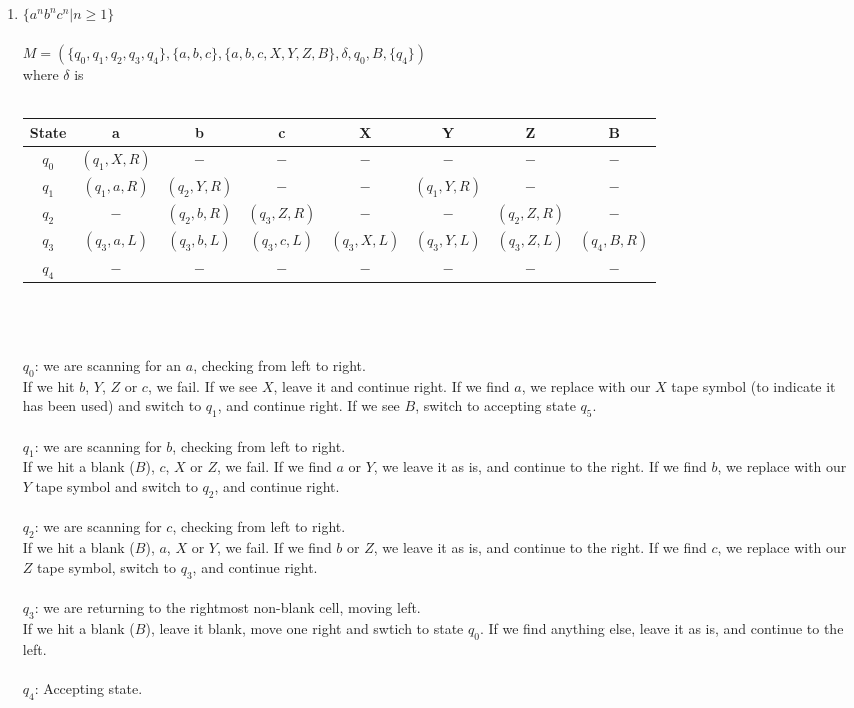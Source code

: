 \documentclass[a4paper]{article}
\begin{document}
\begin{enumerate}
\begin{enumerate}[1.]
\item $\{a^nb^nc^n|n \geq 1\}$
\\ \\
$M = (\{q_0, q_1, q_2, q_3, q_4\}, \{a,b,c\}, \{a,b,c,X, Y, Z, B\}, \delta, q_0, B, \{q_4\})$ \\ 
where $\delta$ is \\
\\
\begin{tabular}{c| c c c c c c c}
State & a & b & c & X & Y & Z & B \\
\hline
$q_0$ & $(q_1, X, R)$ & $-$ & $-$ & $-$ & $-$ & $-$ & $-$ \\
$q_1$ & $(q_1, a, R)$ & $(q_2, Y, R)$ & $-$ & $-$ & $(q_1, Y, R)$ & $-$ & $-$ \\
$q_2$ & $-$ & $(q_2, b, R)$ & $(q_3, Z, R)$ & $-$ & $-$ & $(q_2, Z, R)$ & $-$ \\
$q_3$ & $(q_3,a,L)$ & $(q_3,b,L)$ & $(q_3,c,L)$ & $(q_3,X,L)$ & $(q_3,Y,L)$ & $(q_3,Z,L)$ & $(q_4,B,R)$ \\
$q_4$ & $-$ & $-$ & $-$ & $-$ & $-$ & $-$ & $-$ \\
\end{tabular}
\\ \\ \\
$q_0$: we are scanning for an $a$, checking from left to right. \\
If we hit $b$, $Y$, $Z$ or $c$, we fail. If we see $X$, leave it and continue right. If we find $a$, we replace with our $X$ tape symbol (to indicate it has been used) and switch to $q_1$, and continue right. If we see $B$, switch to accepting state $q_5$. \\
\\
$q_1$: we are scanning for $b$, checking from left to right. \\
If we hit a blank ($B$), $c$, $X$ or $Z$, we fail. If we find $a$ or $Y$, we leave it as is, and continue to the right. If we find $b$, we replace with our $Y$ tape symbol and switch to $q_2$, and continue right. \\
\\
$q_2$: we are scanning for $c$, checking from left to right. \\
If we hit a blank ($B$), $a$, $X$ or $Y$, we fail. If we find $b$ or $Z$, we leave it as is, and continue to the right. If we find $c$, we replace with our $Z$ tape symbol, switch to $q_3$, and continue right. \\
\\
$q_3$: we are returning to the rightmost non-blank cell, moving left. \\
If we hit a blank ($B$), leave it blank, move one right and swtich to state $q_0$. If we find anything else, leave it as is, and continue to the left. \\
\\
$q_4$: Accepting state. \\
\\




\end{enumerate}
\end{enumerate}
\end{document}
